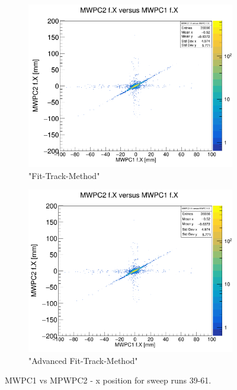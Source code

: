 \documentclass[12pt, letterpaper]{article}
\begin{document}
\begin{figure}[!htbp]
\begin{subfigure}{.5\textwidth}
\end{subfigure}
\begin{subfigure}{.5\textwidth}
  \centering
  \includegraphics[width=.9\linewidth]{plot_imgs/mw2_mw1_fit.png} 
  \caption{"Fit-Track-Method"}
  \label{fig:sub-second}
\end{subfigure}
\begin{subfigure}{.5\textwidth}
  \centering
  \includegraphics[width=.9\linewidth]{plot_imgs/mw2_mw1_last.png} 
  \caption{"Advanced Fit-Track-Method"}
  \label{fig:sub-second}
\end{subfigure}
\caption{MWPC1 vs MPWPC2 - x position for sweep runs 39-61.}
\label{fig:fig}
\end{figure}
\FloatBarrier
\clearpage
\end{document}
